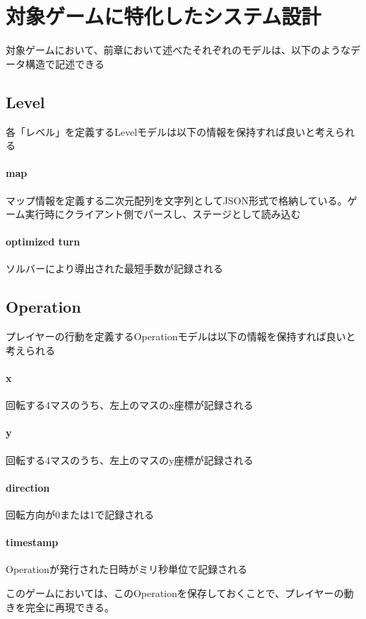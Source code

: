 \section{対象ゲームに特化したシステム設計}
対象ゲームにおいて、前章において述べたそれぞれのモデルは、以下のようなデータ構造で記述できる

\subsection{Level}
各「レベル」を定義するLevelモデルは以下の情報を保持すれば良いと考えられる

\paragraph{map}
マップ情報を定義する二次元配列を文字列としてJSON形式で格納している。ゲーム実行時にクライアント側でパースし、ステージとして読み込む

\paragraph{optimized turn}
ソルバーにより導出された最短手数が記録される

\subsection{Operation}
プレイヤーの行動を定義するOperationモデルは以下の情報を保持すれば良いと考えられる

\paragraph{x}
回転する4マスのうち、左上のマスのx座標が記録される
\paragraph{y}
回転する4マスのうち、左上のマスのy座標が記録される
\paragraph{direction}
回転方向が0または1で記録される
\paragraph{timestamp}
Operationが発行された日時がミリ秒単位で記録される

このゲームにおいては、このOperationを保存しておくことで、プレイヤーの動きを完全に再現できる。
